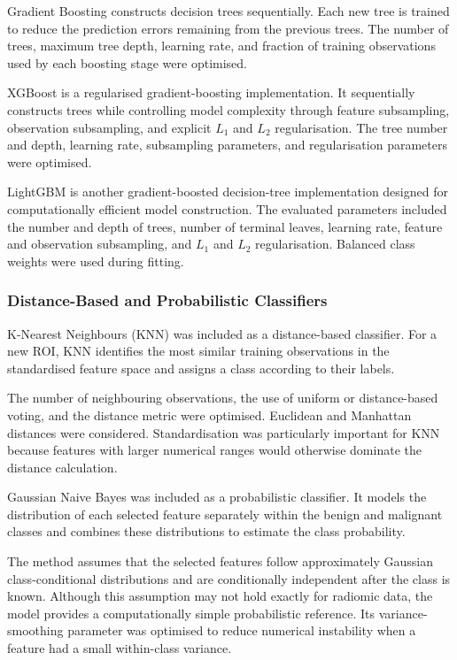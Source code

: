 \documentclass[12pt,twocolumn]{article}
\begin{document}
Gradient Boosting constructs decision trees sequentially. Each new
tree is trained to reduce the prediction errors remaining from the
previous trees. The number of trees, maximum tree depth, learning rate,
and fraction of training observations used by each boosting stage were
optimised.

XGBoost is a regularised gradient-boosting implementation. It
sequentially constructs trees while controlling model complexity
through feature subsampling, observation subsampling, and explicit
\(L_1\) and \(L_2\) regularisation. The tree number and depth,
learning rate, subsampling parameters, and regularisation parameters
were optimised.

LightGBM is another gradient-boosted decision-tree implementation
designed for computationally efficient model construction. The
evaluated parameters included the number and depth of trees, number of
terminal leaves, learning rate, feature and observation subsampling,
and \(L_1\) and \(L_2\) regularisation. Balanced class weights were
used during fitting.






\subsubsection{Distance-Based and Probabilistic Classifiers}
\label{subsubsec:distance_probabilistic_classifiers}

K-Nearest Neighbours (KNN) was included as a distance-based classifier.
For a new ROI, KNN identifies the most similar training observations
in the standardised feature space and assigns a class according to
their labels.

The number of neighbouring observations, the use of uniform or
distance-based voting, and the distance metric were optimised.
Euclidean and Manhattan distances were considered. Standardisation was
particularly important for KNN because features with larger numerical
ranges would otherwise dominate the distance calculation.

Gaussian Naive Bayes was included as a probabilistic classifier. It
models the distribution of each selected feature separately within the
benign and malignant classes and combines these distributions to
estimate the class probability.

The method assumes that the selected features follow approximately
Gaussian class-conditional distributions and are conditionally
independent after the class is known. Although this assumption may not
hold exactly for radiomic data, the model provides a computationally
simple probabilistic reference. Its variance-smoothing parameter was
optimised to reduce numerical instability when a feature had a small
within-class variance.
\end{document}
